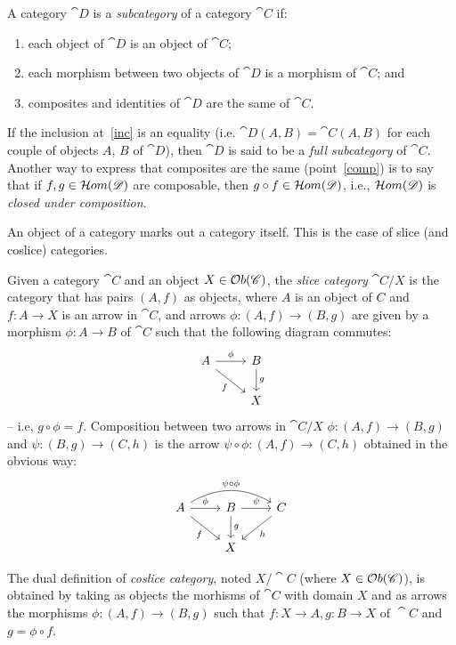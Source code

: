 \begin{definition}[Subcategory]
    A category $\cat{D}$ is a \emph{subcategory} of a category $\cat{C}$ if:
    \begin{enumerate}
        \item each object of $\cat{D}$ is an object of $\cat{C}$;
        \item \label{inc} each morphism between two objects of $\cat{D}$ is a morphism of $\cat{C}$; and
        \item \label{comp} composites and identities of $\cat{D}$ are the same of $\cat{C}$.
    \end{enumerate}

    If the inclusion at~\ref{inc} is an equality (i.e. $\cat{D}(A, B) = \cat{C}(A, B)$ for each couple of objects $A$, $B$ of $\cat{D}$), then $\cat{D}$ is said to be a \emph{full subcategory} of $\cat{C}$.
    Another way to express that composites are the same (point~\ref{comp}) is to say that if $f, g \in \mathcal{H}om(\mathscr{D})$ are composable, then $g \circ f \in \mathcal{H}om(\mathscr{D})$, i.e., $\mathcal{H}om(\mathscr{D})$ is \emph{closed under composition}.
\end{definition}

An object of a category marks out a category itself. This is the case of slice (and coslice) categories.

\begin{definition}\label{def:slice_cat}
    Given a category $\cat{C}$ and an object $X \in \mathcal{O}b(\mathscr{C})$, the \emph{slice category} $\cat{C}/X$ is the category that has pairs $(A, f)$ as objects, where $A$ is an object of $C$ and $f: A \rightarrow X$ is an arrow in $\cat{C}$, and arrows $\phi: (A, f) \rightarrow (B, g)$ are given by a morphism $\phi: A \rightarrow B$ of $\cat{C}$ such that the following diagram commutes:
    \[
        \begin{tikzcd}
            A \arrow[r, "{\phi}"] \arrow[dr, "f" swap] & B \arrow[d, "g"] \\
            & X
        \end{tikzcd}
    \]
    -- i.e, $g \circ \phi = f$.
    Composition between two arrows in $\cat{C}/X$ $\phi: (A, f) \rightarrow (B, g)$ and $\psi: (B, g) \rightarrow (C, h)$ is the arrow $\psi \circ \phi : (A, f) \rightarrow (C, h)$ obtained in the obvious way:
    \[
        \begin{tikzcd}
            A \arrow[bend left=30]{rr}{\psi \circ \phi}  \arrow[r, "{\phi}"] \arrow[dr, "f" swap] & B \arrow[r, "{\psi}"] \arrow[d, "g"] & C \arrow[dl, "h"] \\
            & X & 
        \end{tikzcd}
    \]

    The dual definition of \emph{coslice category}, noted $X/\cat{C}$ (where $X \in \mathcal{O}b(\mathscr{C})$), is obtained by taking as objects the morhisms of $\cat{C}$ with domain $X$ and as arrows the morphisms $\phi: (A, f) \rightarrow (B, g)$ such that $f:X\rightarrow A, g:B \rightarrow X \text{ of }\cat{C}$ and $g = \phi \circ f$. 
\end{definition}

